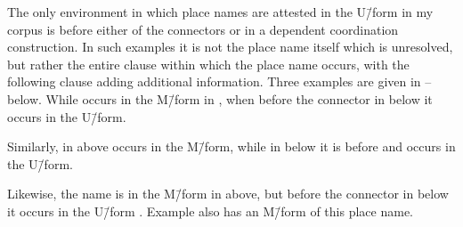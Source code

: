 The only environment in which place names are attested in the U\=/form in my corpus
is before either of the connectors  or 
in a dependent coordination construction.
In such examples it is not the place name itself which is unresolved,
but rather the entire clause within which the place name occurs,
with the following clause adding additional information.
Three examples are given in -- below.
While  occurs in the M\=/form in ,
when before the connector  in 
below it occurs in the U\=/form.

\begin{exe}
	\label{ex:130914-3, 0.23}
\end{exe}

Similarly, in  above  occurs in the M\=/form,
while in  below it is before  and occurs in the U\=/form.

\begin{exe}
		\label{ex:130907-3, 4.41-4.45}
\end{exe}

Likewise, the name  is in the M\=/form in  above,
but before the connector  in  below
it occurs in the U\=/form .
Example  also has an M\=/form of this place name.

